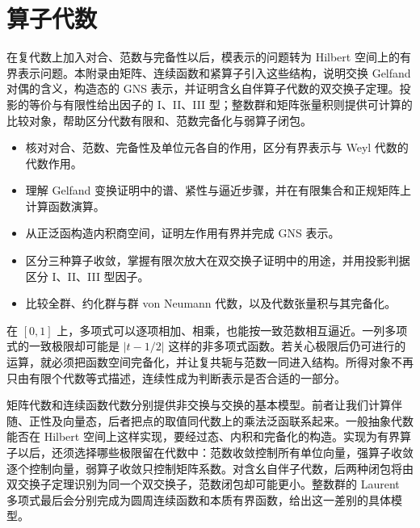 

\chapter{算子代数}
\label{b2:app:D}

\begin{chapterabstract}
	在复代数上加入对合、范数与完备性以后，模表示的问题转为 Hilbert 空间上的有界表示问题。本附录由矩阵、连续函数和紧算子引入这些结构，说明交换 Gelfand 对偶的含义，构造态的 GNS 表示，并证明含幺自伴算子代数的双交换子定理。投影的等价与有限性给出因子的 I、II、III 型；整数群和矩阵张量积则提供可计算的比较对象，帮助区分代数有限和、范数完备化与弱算子闭包。
\end{chapterabstract}

\begin{learninggoals}
	\begin{itemize}
		\item 核对对合、范数、完备性及单位元各自的作用，区分有界表示与 Weyl 代数的代数作用。
		\item 理解 Gelfand 变换证明中的谱、紧性与逼近步骤，并在有限集合和正规矩阵上计算函数演算。
		\item 从正泛函构造内积商空间，证明左作用有界并完成 GNS 表示。
		\item 区分三种算子收敛，掌握有限次放大在双交换子证明中的用途，并用投影判据区分 I、II、III 型因子。
		\item 比较全群、约化群与群 von Neumann 代数，以及代数张量积与其完备化。
	\end{itemize}
\end{learninggoals}

在 \([0,1]\) 上，多项式可以逐项相加、相乘，也能按一致范数相互逼近。一列多项式的一致极限却可能是 \(|t-1/2|\) 这样的非多项式函数。若关心极限后仍可进行的运算，就必须把函数空间完备化，并让复共轭与范数一同进入结构。所得对象不再只由有限个代数等式描述，连续性成为判断表示是否合适的一部分。

\ProseParagraphBreak

矩阵代数和连续函数代数分别提供非交换与交换的基本模型。前者让我们计算伴随、正性及向量态，后者把点的取值同代数上的乘法泛函联系起来。一般抽象代数能否在 Hilbert 空间上这样实现，要经过态、内积和完备化的构造。实现为有界算子以后，还须选择哪些极限留在代数中：范数收敛控制所有单位向量，强算子收敛逐个控制向量，弱算子收敛只控制矩阵系数。对含幺自伴子代数，后两种闭包将由双交换子定理识别为同一个双交换子，范数闭包却可能更小。整数群的 Laurent 多项式最后会分别完成为圆周连续函数和本质有界函数，给出这一差别的具体模型。

